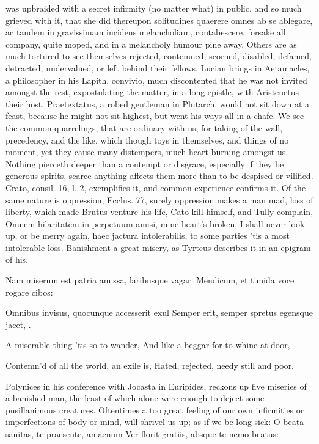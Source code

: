 {{was upbraided with a secret infirmity (no matter what) in public, and
so much grieved with it, that she did thereupon solitudines quaerere
omnes ab se ablegare, ac tandem in gravissimam incidens melancholiam,
contabescere, forsake all company, quite moped, and in a melancholy
humour pine away. Others are as much tortured to see themselves
rejected, contemned, scorned, disabled, defamed, detracted,
undervalued, or left behind their fellows. Lucian brings in
Aetamacles, a philosopher in his Lapith. convivio, much discontented
that he was not invited amongst the rest, expostulating the matter, in
a long epistle, with Aristenetus their host. Praetextatus, a robed
gentleman in Plutarch, would not sit down at a feast, because he might
not sit highest, but went his ways all in a chafe. We see the common
quarrelings, that are ordinary with us, for taking of the wall,
precedency, and the like, which though toys in themselves, and things
of no moment, yet they cause many distempers, much heart-burning
amongst us. Nothing pierceth deeper than a contempt or disgrace,
especially if they be generous spirits, scarce anything affects
them more than to be despised or vilified. Crato, consil. 16, l. 2,
exemplifies it, and common experience confirms it. Of the same nature
is oppression, Ecclus. 77, surely oppression makes a man mad, loss of
liberty, which made Brutus venture his life, Cato kill himself, and
Tully complain, Omnem hilaritatem in perpetuum amisi, mine
heart's broken, I shall never look up, or be merry again, haec
jactura intolerabilis, to some parties 'tis a most intolerable loss.
Banishment a great misery, as Tyrteus describes it in an epigram of
his,

Nam miserum est patria amissa, laribusque vagari
Mendicum, et timida voce rogare cibos:

Omnibus invisus, quocunque accesserit exul
Semper erit, semper spretus egensque jacet, \etc{}.


A miserable thing 'tis so to wander,
And like a beggar for to whine at door,

Contemn'd of all the world, an exile is,
Hated, rejected, needy still and poor.

Polynices in his conference with Jocasta in Euripides, reckons up
five miseries of a banished man, the least of which alone were enough
to deject some pusillanimous creatures. Oftentimes a too great feeling
of our own infirmities or imperfections of body or mind, will shrivel
us up; as if we be long sick:
O beata sanitas, te praesente, amaenum
Ver florit gratiis, absque te nemo beatus:

}}
